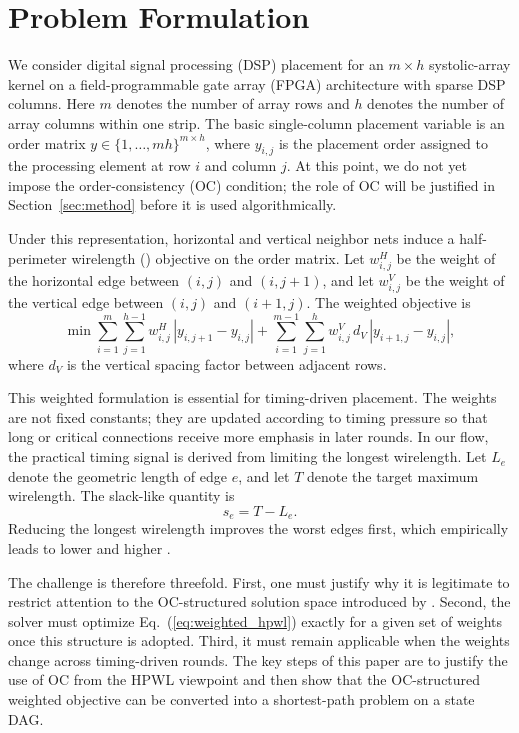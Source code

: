 \section{Problem Formulation}
\label{sec:problem}

We consider digital signal processing (DSP) placement for an $m \times h$ systolic-array kernel on a field-programmable gate array (FPGA) architecture with sparse DSP columns. Here $m$ denotes the number of array rows and $h$ denotes the number of array columns within one strip. The basic single-column placement variable is an order matrix $y \in \{1,\dots,mh\}^{m\times h}$, where $y_{i,j}$ is the placement order assigned to the processing element at row $i$ and column $j$. At this point, we do not yet impose the order-consistency (OC) condition; the role of OC will be justified in Section~\ref{sec:method} before it is used algorithmically.

Under this representation, horizontal and vertical neighbor nets induce a half-perimeter wirelength (\hpwl) objective on the order matrix. Let $w^H_{i,j}$ be the weight of the horizontal edge between $(i,j)$ and $(i,j+1)$, and let $w^V_{i,j}$ be the weight of the vertical edge between $(i,j)$ and $(i+1,j)$. The weighted objective is
\begin{equation}
\min \sum_{i=1}^{m}\sum_{j=1}^{h-1} w^H_{i,j}\,|y_{i,j+1}-y_{i,j}|
    + \sum_{i=1}^{m-1}\sum_{j=1}^{h} w^V_{i,j}\, d_V\, |y_{i+1,j}-y_{i,j}|,
\label{eq:weighted_hpwl}
\end{equation}
where $d_V$ is the vertical spacing factor between adjacent rows.

This weighted formulation is essential for timing-driven placement. The weights are not fixed constants; they are updated according to timing pressure so that long or critical connections receive more emphasis in later rounds. In our flow, the practical timing signal is derived from limiting the longest wirelength. Let $L_e$ denote the geometric length of edge $e$, and let $T$ denote the target maximum wirelength. The slack-like quantity is
\begin{equation}
s_e = T - L_e.
\label{eq:slack}
\end{equation}
Reducing the longest wirelength improves the worst edges first, which empirically leads to lower \wns and higher \fmax.

The challenge is therefore threefold. First, one must justify why it is legitimate to restrict attention to the OC-structured solution space introduced by \rsad. Second, the solver must optimize Eq.~(\ref{eq:weighted_hpwl}) exactly for a given set of weights once this structure is adopted. Third, it must remain applicable when the weights change across timing-driven rounds. The key steps of this paper are to justify the use of OC from the HPWL viewpoint and then show that the OC-structured weighted objective can be converted into a shortest-path problem on a state DAG.
